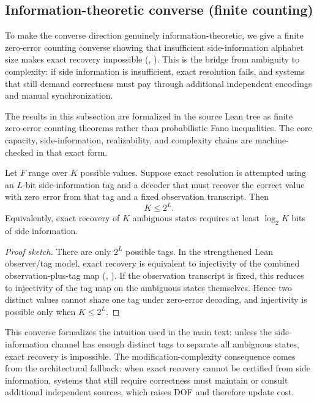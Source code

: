 \subsection{Information-theoretic converse (finite counting)}\label{sec:info-converse}

To make the converse direction genuinely information-theoretic, we give a finite zero-error counting converse showing that insufficient side-information alphabet size makes exact recovery impossible (, ). This is the bridge from ambiguity to complexity: if side information is insufficient, exact resolution fails, and systems that still demand correctness must pay through additional independent encodings and manual synchronization.

\begin{remark}
The results in this subsection are formalized in the source Lean tree as finite zero-error counting theorems rather than probabilistic Fano inequalities. The core capacity, side-information, realizability, and complexity chains are machine-checked in that exact form.
\end{remark}

\begin{theorem}\label{thm:fano-converse}
Let $F$ range over $K$ possible values. Suppose exact resolution is attempted using an $L$-bit side-information tag and a decoder that must recover the correct value with zero error from that tag and a fixed observation transcript. Then
\[
K \le 2^L.
\]
Equivalently, exact recovery of $K$ ambiguous states requires at least $\log_2 K$ bits of side information.
\end{theorem}

\begin{proof}[Proof sketch]
There are only $2^L$ possible tags. In the strengthened Lean observer/tag model, exact recovery is equivalent to injectivity of the combined observation-plus-tag map (, ). If the observation transcript is fixed, this reduces to injectivity of the tag map on the ambiguous states themselves. Hence two distinct values cannot share one tag under zero-error decoding, and injectivity is possible only when $K\le 2^L$.
\end{proof}

\noindent This converse formalizes the intuition used in the main text: unless the side-information channel has enough distinct tags to separate all ambiguous states, exact recovery is impossible. The modification-complexity consequence comes from the architectural fallback: when exact recovery cannot be certified from side information, systems that still require correctness must maintain or consult additional independent sources, which raises DOF and therefore update cost.

